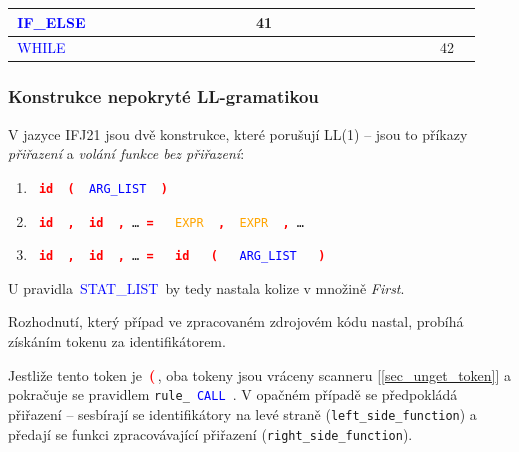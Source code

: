 \documentclass[a4paper]{article}
\theoremstyle{definition}
\newcommand{\nter}[1]{\textcolor{blue}{\,#1\,}}
\newcommand{\ter}[1]{\textbf{\textcolor{red}{\,#1\,}}}
\newcommand{\precter}[1]{\textcolor{orange}{\,#1\,}}
\begin{document}
\begin{center}
{\begin{tabular}{| l || c | c | c | c | c | c | c | c | c | c | c | c | c | c | c | c | c | c | c | c | c | c | c | c | c |}
	\nter{IF\_ELSE}    &         &         &         &         &         &          &            &           &                &              &          &   41     &               &                &                   &                   &             &           &              &               &              &              &            &             & \\\hline
	\nter{WHILE}       &         &         &         &         &         &          &            &           &                &              &          &          &               &                &                   &                   &             &           &              &               &              &              &            &    42       & \\

\end{tabular}
}
\end{center}

\subsubsection{Konstrukce nepokryté LL-gramatikou} %

V jazyce IFJ21 jsou dvě konstrukce, které porušují LL(1) -- jsou to příkazy \emph{přiřazení} a \emph{volání funkce bez přiřazení}:

\begin{enumerate}
	\item \texttt{\ter{id}\ter{(}\nter{ARG\_LIST}\ter{)}}

	\item \texttt{\ter{id}\ter{,}\ter{id}\ter{,}\dots \ter{=} \precter{EXPR}\ter{,}\precter{EXPR}\ter{,}\dots}

	\item \texttt{\ter{id}\ter{,}\ter{id}\ter{,}\dots \ter{=} \ter{id} \ter{(} \nter{ARG\_LIST} \ter{)}}
\end{enumerate}

U pravidla \nter{STAT\_LIST} by tedy nastala kolize v množině \emph{First}.

Rozhodnutí, který případ ve zpracovaném zdrojovém kódu nastal, probíhá získáním tokenu za identifikátorem.

Jestliže tento token je \ter{(}, oba tokeny jsou vráceny scanneru [\ref{sec_unget_token}] a pokračuje se pravidlem \texttt{rule\_\nter{CALL}}. V opačném případě se předpokládá přiřazení -- sesbírají se identifikátory na levé straně (\texttt{left\_side\_function}) a předají se funkci zpracovávající přiřazení (\texttt{right\_side\_function}). 
\end{document}
